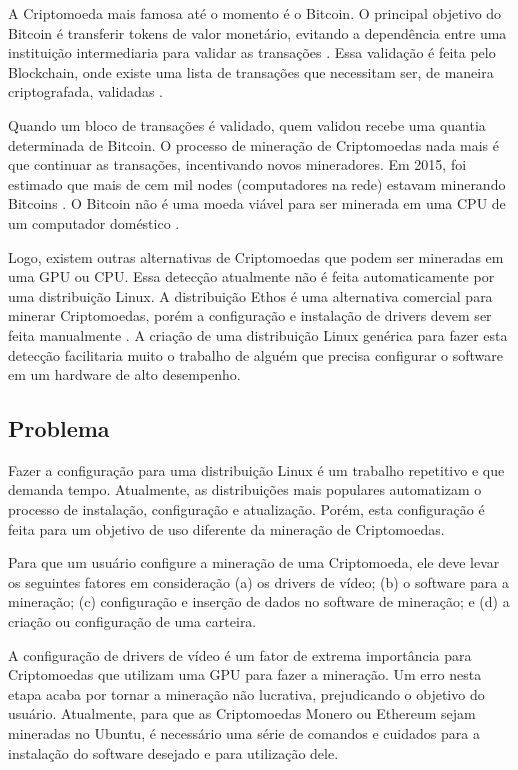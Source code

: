 \documentclass[
article,			%
12pt,				%
openright,			%
oneside,			%
a4paper,			%
chapter=TITLE,		%
section=TITLE,		%
subsection=TITLE,	%
subsubsection=TITLE,%
subsubsubsection=TITLE, %
english,			%
brazil,				%
]{abntex2}
\begin{document}
A Criptomoeda mais famosa até o momento é o Bitcoin. O principal
objetivo do Bitcoin é transferir tokens de valor monetário, evitando a
dependência entre uma instituição intermediaria para validar as
transações \cite{Nakamoto2008}. Essa validação é feita pelo
Blockchain, onde existe uma lista de transações que necessitam ser, de
maneira criptografada, validadas \cite{Economist2015}.

Quando um bloco de transações é validado, quem validou recebe uma
quantia determinada de Bitcoin. O processo de mineração de
Criptomoedas nada mais é que continuar as transações, incentivando
novos mineradores. Em 2015, foi estimado que mais de cem mil nodes
(computadores na rede) estavam minerando Bitcoins \cite{Coin2015}. O
Bitcoin não é uma moeda viável para ser minerada em uma CPU de um
computador doméstico \cite{Bitcoins2018}.

Logo, existem outras alternativas de Criptomoedas que podem ser
mineradas em uma GPU ou CPU\@. Essa detecção atualmente não é feita
automaticamente por uma distribuição Linux. A distribuição Ethos é uma
alternativa comercial para minerar Criptomoedas, porém a configuração
e instalação de drivers devem ser feita manualmente \cite{EthOS2018}.
A criação de uma distribuição Linux genérica para fazer esta detecção
facilitaria muito o trabalho de alguém que precisa configurar o
software em um hardware de alto desempenho.

\subsection{Problema}

Fazer a configuração para uma distribuição Linux é um trabalho
repetitivo e que demanda tempo. Atualmente, as distribuições mais
populares automatizam o processo de instalação, configuração e
atualização. Porém, esta configuração é feita para um objetivo de uso
diferente da mineração de Criptomoedas.

Para que um usuário configure a mineração de uma Criptomoeda, ele deve
levar os seguintes fatores em consideração (a) os drivers de vídeo;
(b) o software para a mineração; (c) configuração e inserção de dados
no software de mineração; e (d) a criação ou configuração de uma
carteira. 

A configuração de drivers de vídeo é um fator de extrema importância
para Criptomoedas que utilizam uma GPU para fazer a mineração. Um erro
nesta etapa acaba por tornar a mineração não lucrativa, prejudicando o
objetivo do usuário. Atualmente, para que as Criptomoedas Monero ou
Ethereum sejam mineradas no Ubuntu, é necessário uma série de comandos
e cuidados para a instalação do software desejado e para utilização
dele.
\end{document}
